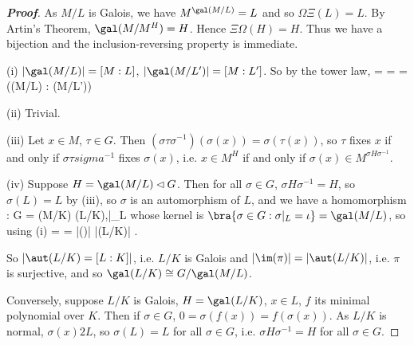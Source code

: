 \begin{proof}[\bf Proof]
As $M/L$ is Galois, we have $M^{\gal(M/L)} = L$ and so $\Omega \Xi(L) = L$. By Artin's Theorem, $\gal(M/M^H) = H$. Hence $\Xi\Omega(H) = H$. Thus we have a bijection and the inclusion-reversing property is immediate.
\ben
\item [(i)] $|\gal(M/L)| = [M : L]$, $|\gal(M/L')| = [M : L']$. So by the tower law,
\be
[L' : L] = \frac{[M : L]}{[M : L']} =  = (\gal(M/L) : \gal(M/L'))
\ee
\item [(ii)] Trivial.
\item [(iii)] Let $x \in M$, $\tau \in G$. Then $(\sigma \tau \sigma^{-1})(\sigma(x)) = \sigma(\tau(x))$, so $\tau$ fixes $x$ if and only if $\sigma \tau sigma^{-1}$ fixes $\sigma(x)$, i.e. $x \in M^H$ if and only if $\sigma(x) \in M^{\sigma H\sigma^{-1}}$.
\item [(iv)] Suppose $H = \gal(M/L) \lhd G$. Then for all $\sigma \in G$, $\sigma H\sigma^{-1} = H$, so $\sigma(L) = L$ by (iii), so $\sigma$ is an automorphism of $L$, and we have a homomorphism 
\be
\pi  : G = \gal(M/K) \to \aut(L/K),\quad  \sigma \mapsto \sigma|_L
\ee
whose kernel is $\bra{\sigma \in G : \sigma|_L = \iota} = \gal(M/L)$, so using (i)
\be
[L : K] =  = |\im(\pi )| \leq  |\aut(L/K)| \leq  [L : K].
\ee

So $|\aut(L/K) = [L : K]|$, i.e. $L/K$ is Galois and $|\im(\pi )| = |\aut(L/K)|$, i.e. $\pi$ is surjective, and so $\gal(L/K) \cong G/ \gal(M/L)$.

Conversely, suppose $L/K$ is Galois, $H = \gal(L/K)$, $x \in L$, $f$ its minimal polynomial over $K$. Then if $\sigma \in G$, $0 = \sigma(f(x)) = f(\sigma(x))$. As $L/K$ is normal, $\sigma(x) 2 L$, so $\sigma(L) = L$ for all $\sigma \in G$, i.e. $\sigma H\sigma^{-1} = H$ for all $\sigma \in G$.
\een
\end{proof}


